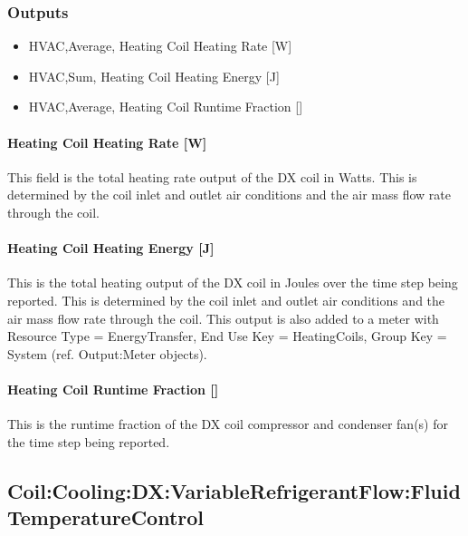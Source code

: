 \subsubsection{Outputs}\label{outputs-6-003}

\begin{itemize}
\item
  HVAC,Average, Heating Coil Heating Rate {[}W{]}
\item
  HVAC,Sum, Heating Coil Heating Energy {[}J{]}
\item
  HVAC,Average, Heating Coil Runtime Fraction {[]}
\end{itemize}

\paragraph{Heating Coil Heating Rate {[}W{]}}\label{heating-coil-heating-rate-w-4}

This field is the total heating rate output of the DX coil in Watts. This is determined by the coil inlet and outlet air conditions and the air mass flow rate through the coil.

\paragraph{Heating Coil Heating Energy {[}J{]}}\label{heating-coil-heating-energy-j-4}

This is the total heating output of the DX coil in Joules over the time step being reported. This is determined by the coil inlet and outlet air conditions and the air mass flow rate through the coil. This output is also added to a meter with Resource Type = EnergyTransfer, End Use Key = HeatingCoils, Group Key = System (ref. Output:Meter objects).

\paragraph{Heating Coil Runtime Fraction {[]}}\label{heating-coil-runtime-fraction-1}

This is the runtime fraction of the DX coil compressor and condenser fan(s) for the time step being reported.

\subsection{Coil:Cooling:DX:VariableRefrigerantFlow:FluidTemperatureControl}\label{coilcoolingdxvariablerefrigerantflowfluidtemperaturecontrol}

